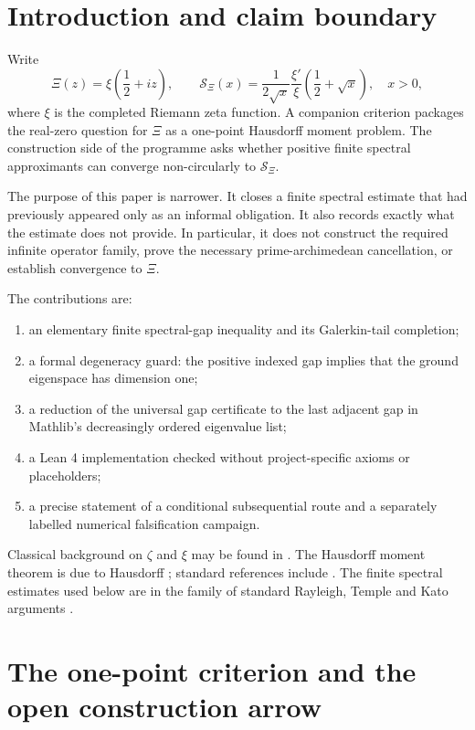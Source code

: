 \documentclass[11pt]{article}
\theoremstyle{definition}
\newcommand{\XiR}{\mathcal{S}_{\Xi}}
\begin{document}
\section{Introduction and claim boundary}

Write
\[
 \Xi(z)=\xi\!\left(\frac12+iz\right),
 \qquad
 \XiR(x)=\frac{1}{2\sqrt{x}}
 \frac{\xi'}{\xi}\!\left(\frac12+\sqrt{x}\right),
 \quad x>0,
\]
where $\xi$ is the completed Riemann zeta function.  A companion criterion
packages the real-zero question for $\Xi$ as a one-point Hausdorff moment
problem.  The construction side of the programme asks whether positive finite
spectral approximants can converge non-circularly to $\XiR$.

The purpose of this paper is narrower.  It closes a finite spectral estimate
that had previously appeared only as an informal obligation.  It also records
exactly what the estimate does not provide.  In particular, it does not
construct the required infinite operator family, prove the necessary
prime-archimedean cancellation, or establish convergence to $\Xi$.

The contributions are:
\begin{enumerate}[label=(\roman*)]
  \item an elementary finite spectral-gap inequality and its Galerkin-tail
  completion;
  \item a formal degeneracy guard: the positive indexed gap implies that the
  ground eigenspace has dimension one;
  \item a reduction of the universal gap certificate to the last adjacent gap
  in Mathlib's decreasingly ordered eigenvalue list;
  \item a Lean 4 implementation checked without project-specific axioms or
  placeholders;
  \item a precise statement of a conditional subsequential route and a
  separately labelled numerical falsification campaign.
\end{enumerate}

Classical background on $\zeta$ and $\xi$ may be found in
\cite{riemann1859,titchmarsh1986}.  The Hausdorff moment theorem is due to
Hausdorff \cite{hausdorff1921}; standard references include
\cite{shohat1943,akhiezer1965}.  The finite spectral estimates used below are
in the family of standard Rayleigh, Temple and Kato arguments
\cite{kato1995}.

\section{The one-point criterion and the open construction arrow}
\end{document}
